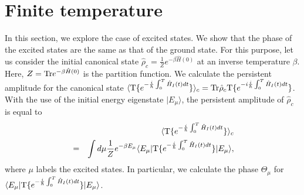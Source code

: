 \documentclass[aps,pre,twocolumn,eqsecnum,showpacs,superscriptaddress]{revtex4}
\begin{document}
\section{Finite temperature}
In this section, we explore the case of excited states.
We show that the phase of the excited states are the same as that of the ground state. 
For this purpose, let us consider the initial canonical state $\hat{\rho}_c=\frac{1}{Z}e^{-\beta\hat{H}(0)}$ at an inverse temperature $\beta$. Here, $Z={\rm Tr}e^{-\beta\hat{H}(0)}$ is the partition function. 
We calculate the persistent amplitude for the canonical state $\langle {\rm T}\{e^{-\frac{i}{\hbar}\int_0^T\hat{H}_I(t)dt}\}\rangle_c={\rm Tr}\hat{\rho}_c{\rm T}\{e^{-i\frac{i}{\hbar}\int_0^T\hat{H}_I(t)dt}\}$.
With the use of the initial energy eigenstate $|E_\mu\rangle$, the persistent amplitude of $\hat{\rho}_c$ is equal to    
\begin{eqnarray}
&&\langle{\rm T}\{e^{-\frac{i}{\hbar}\int_0^T\hat{H}_I(t)dt}\}\rangle_c \nonumber \\
&=&\int d\mu \frac{1}{Z}e^{-\beta E_\mu}\langle E_\mu|{\rm T}\{e^{-\frac{i}{\hbar}\int_0^T\hat{H}_I(t)dt}\}|E_\mu\rangle, \label{energyshift5}
\end{eqnarray}
where $\mu$ labels the excited states.
In particular, we calculate the phase $\Theta_\mu$ for $\langle E_\mu|{\rm T}\{e^{-\frac{i}{\hbar}\int_0^T\hat{H}_I(t)dt}\}|E_\mu\rangle$. 
 
\end{document}
